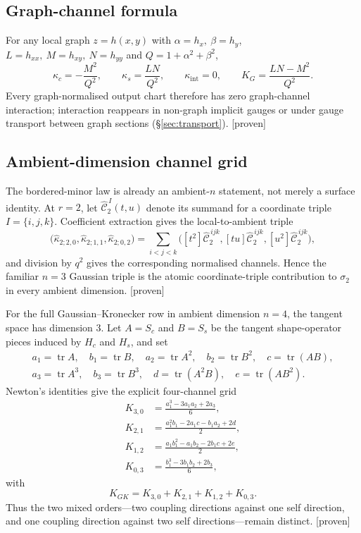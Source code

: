 \documentclass[11pt]{article}
\newcommand{\Proven}{\textsf{[proven]}}
\theoremstyle{plain}
\theoremstyle{definition}
\newcommand{\KG}{K_{G}}
\newcommand{\kc}{\kappa_{c}}
\newcommand{\kint}{\kappa_{\mathrm{int}}}
\newcommand{\ks}{\kappa_{s}}
\begin{document}
\subsection{Graph-channel formula}
For any local graph $z=h(x,y)$ with $\alpha=h_x,\ \beta=h_y$, $L=h_{xx},\ M=h_{xy},\ N=h_{yy}$ and
$Q=1+\alpha^2+\beta^2$,
\[
\kc=-\frac{M^2}{Q^2},\qquad \ks=\frac{LN}{Q^2},\qquad \kint=0,\qquad
\KG=\frac{LN-M^2}{Q^2}.
\]
Every graph-normalised output chart therefore has zero graph-channel interaction; interaction
reappears in non-graph implicit gauges or under gauge transport between graph sections
(\S\ref{sec:transport}). \Proven

\subsection{Ambient-dimension channel grid}
The bordered-minor law is already an ambient-$n$ statement, not merely a surface identity.  At
$r=2$, let $\widehat{\mathcal C}^{\,I}_2(t,u)$ denote its summand for a coordinate triple
$I=\{i,j,k\}$.  Coefficient extraction gives the local-to-ambient triple
\[
\bigl(\widehat\kappa_{2;2,0},\widehat\kappa_{2;1,1},\widehat\kappa_{2;0,2}\bigr)
=\sum_{i<j<k}
\bigl([t^2]\widehat{\mathcal C}^{\,ijk}_2,
      [tu]\widehat{\mathcal C}^{\,ijk}_2,
      [u^2]\widehat{\mathcal C}^{\,ijk}_2\bigr),
\]
and division by $q^2$ gives the corresponding normalised channels.  Hence the familiar
$n=3$ Gaussian triple is the atomic coordinate-triple contribution to $\sigma_2$ in every ambient
dimension. \Proven

For the full Gaussian--Kronecker row in ambient dimension $n=4$, the tangent space has dimension $3$.
Let $A=S_c$ and $B=S_s$ be the tangent shape-operator pieces induced by $H_c$ and $H_s$, and set
\[
\begin{gathered}
a_1=\operatorname{tr}A,\quad b_1=\operatorname{tr}B,\quad
a_2=\operatorname{tr}A^2,\quad b_2=\operatorname{tr}B^2,\quad
c=\operatorname{tr}(AB),\\
a_3=\operatorname{tr}A^3,\quad b_3=\operatorname{tr}B^3,\quad
d=\operatorname{tr}(A^2B),\quad e=\operatorname{tr}(AB^2).
\end{gathered}
\]
Newton's identities give the explicit four-channel grid
\begin{align*}
K_{3,0}&=\frac{a_1^3-3a_1a_2+2a_3}{6},\\
K_{2,1}&=\frac{a_1^2b_1-2a_1c-b_1a_2+2d}{2},\\
K_{1,2}&=\frac{a_1b_1^2-a_1b_2-2b_1c+2e}{2},\\
K_{0,3}&=\frac{b_1^3-3b_1b_2+2b_3}{6},
\end{align*}
with
\[
K_{GK}=K_{3,0}+K_{2,1}+K_{1,2}+K_{0,3}.
\]
Thus the two mixed orders---two coupling directions against one self direction, and one coupling
direction against two self directions---remain distinct. \Proven
\end{document}
